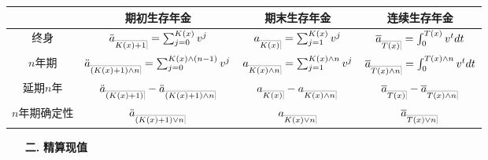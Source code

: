 \documentclass[a4paper,10pt]{ctexbook}
\makeatletter
\newcommand{\hei}{\CJKfamily{hei}}      %
\DeclareRobustCommand{\annu}[1]{_{%
    \def\arraystretch{0}%
    \setlength\arraycolsep{1pt}%
    \setlength\arrayrulewidth{.2pt}%
    \begin{array}[b]{@{}c|}\hline
        \\[\arraycolsep]%
        \scriptstyle #1%
    \end{array}%
}}
\makeatother
\begin{document}
\begin{center}
    \begin{tabular}{ |c|c|c|c| }
        \hline
                 & 期初生存年金                                                                 & 期末生存年金                                                           & 连续生存年金                                                           \\
        \hline
        终身       & $\ddot a_{\annu{K(x)+1}} = \sum_{j=0}^{K(x)}{v^j}$                     & $a_{\annu{K(x)}} = \sum_{j=1}^{K(x)}{v^j}$                       & $\overline{a}_{\annu{T(x)}}=\int_0^{T(x)} v^tdt$                 \\
        \hline
        $n$年期    & $\ddot a_{\annu{(K(x)+1)\land n}} = \sum_{j=0}^{K(x)\land (n-1)}{v^j}$ & $a_{\annu{K(x)\land n}} = \sum_{j=1}^{K(x)\land n}{v^j}$         & $  \overline{a}_{\annu{T(x)\land n}}=\int_0^{T(x)\land n} v^tdt$ \\
        \hline
        延期$n$年   & $\ddot a_{\annu{(K(x)+1)}} - \ddot a_{\annu{(K(x)+1)\land n}}$
                 & $a_{\annu{K(x)}} - a_{\annu{K(x)\land n}}$                             & $\overline{a}_{\annu{T(x)}} - \overline{a}_{\annu{T(x)\land n}}$                                                                    \\
        \hline

        $n$年期确定性 & $\ddot a_{\annu{(K(x)+1)\lor n}}$                                      & $a_{\annu{K(x)\lor n}}$                                          & $\overline{a}_{\annu{T(x)\lor n}}$                               \\

        \hline
    \end{tabular}
\end{center}

\begin{itemize}
    \item[{\bf\hei 二.}]{\bf\hei 精算现值}
\end{itemize}
\end{document}
